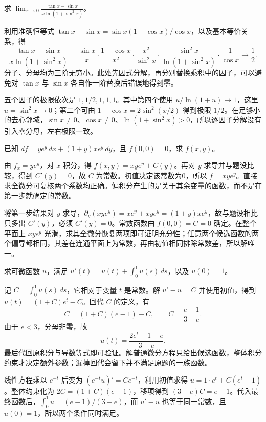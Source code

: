 \documentclass[12pt,fontset=fandol]{ctexart}
\begin{document}
\begin{example}\label{nm-final9-1a}
求 $\displaystyle\lim_{x\to0}\frac{\tan x-\sin x}{x\ln(1+\sin^2x)}$。
\end{example}
\begin{solve}
利用准确恒等式 $\tan x-\sin x=\sin x(1-\cos x)/\cos x$，以及基本等价关系，得
\[
 \frac{\tan x-\sin x}{x\ln(1+\sin^2x)}
 =\frac{\sin x}{x}\cdot\frac{1-\cos x}{x^2}
 \cdot\frac{x^2}{\sin^2x}\cdot
 \frac{\sin^2x}{\ln(1+\sin^2x)}\cdot\frac1{\cos x}
 \longrightarrow\frac12.
\]
分子、分母均为三阶无穷小。此处先因式分解，再分别替换乘积中的因子，可以避免对 $\tan x$ 与 $\sin x$ 各自作一阶替换后错误地得到零。

五个因子的极限依次是 $1,1/2,1,1,1$。其中第四个使用 $u/\ln(1+u)\to1$，这里 $u=\sin^2x\to0$；第二个可由 $1-\cos x=2\sin^2(x/2)$ 得到极限 $1/2$。在足够小的去心邻域，$\sin x\ne0$、$\cos x\ne0$、$\ln(1+\sin^2x)>0$，所以逐因子分解没有引入零分母，左右极限一致。

\end{solve}

\begin{example}\label{nm-final9-1c}
已知 $df=ye^y\,dx+(1+y)xe^y\,dy$，且 $f(0,0)=0$，求 $f(x,y)$。
\end{example}
\begin{solve}
由 $f_x=ye^y$，对 $x$ 积分，得 $f(x,y)=xye^y+C(y)$。再对 $y$ 求导并与题设比较，得到 $C'(y)=0$，故 $C$ 为常数。初值决定该常数为0，所以 $f=xye^y$。直接求全微分可复核两个系数均正确。偏积分产生的是关于其余变量的函数，而不是在第一步就确定的常数。

将第一步结果对 $y$ 求导，$\partial_y(xye^y)=xe^y+xye^y=(1+y)xe^y$，故与题设相比只多出 $C'(y)$，必须 $C'(y)=0$。常数函数由 $f(0,0)=C=0$ 确定。在整个平面上 $xye^y$ 光滑，求其全微分恢复两项即可证明充分性；任意两个候选函数的两个偏导都相同，其差在连通平面上为常数，再由初值相同排除常数差，所以解唯一。

\end{solve}

\begin{example}\label{nm-final9-1d}
求可微函数 $u$，满足 $\displaystyle u'(t)=u(t)+\int_0^1u(s)\,ds$，以及 $u(0)=1$。
\end{example}
\begin{solve}
记 $C=\int_0^1u(s)\,ds$，它相对于变量 $t$ 是常数。解 $u'-u=C$ 并使用初值，得到 $u(t)=(1+C)e^t-C$。回代 $C$ 的定义，有
\[
 C=(1+C)(e-1)-C,
 \qquad C=\frac{e-1}{3-e}.
\]
由于 $e<3$，分母非零，故
\[
 u(t)=\frac{2e^t+1-e}{3-e}.
\]
最后代回原积分与导数等式即可验证。解普通微分方程只给出候选函数，整体积分约束才决定额外参数；漏掉回代会留下并不满足原题的一族函数。

线性方程乘以 $e^{-t}$ 后变为 $(e^{-t}u)'=Ce^{-t}$，利用初值求得 $u=1\cdot e^t+C(e^t-1)$。整体约束化为 $2C=(1+C)(e-1)$，移项得到 $(3-e)C=e-1$。代入最终函数后，$\int_0^1u=(e-1)/(3-e)$，而 $u'-u$ 也等于同一常数，且 $u(0)=1$，所以两个条件同时满足。

\end{solve}
\end{document}
